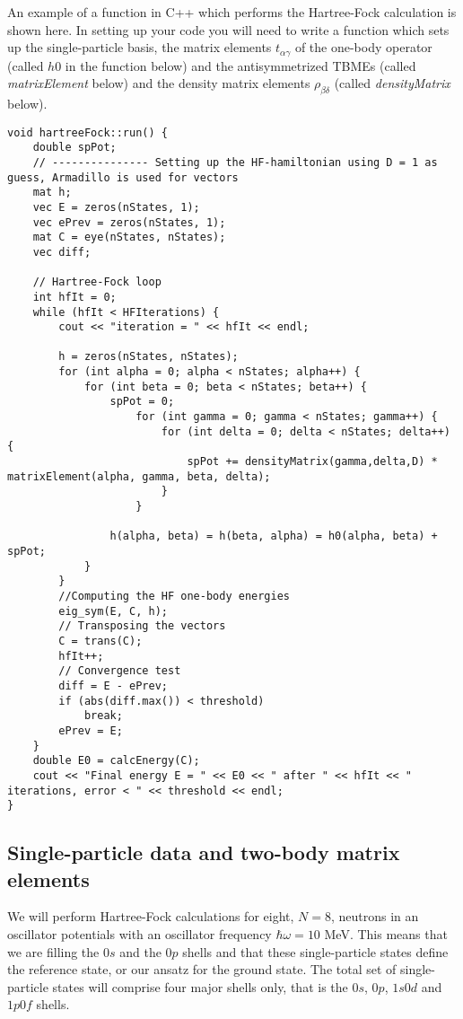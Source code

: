 \documentclass[11pt,a4wide]{article}
\begin{document}
An example of a function in C++ which performs the Hartree-Fock calculation is shown here. In setting up your code you will need to write a function which sets up the single-particle basis, the matrix elements $t_{\alpha\gamma}$ of the one-body operator (called $h0$ in the function below) and the antisymmetrized TBMEs (called {\em matrixElement} below) and the density matrix elements $\rho_{\beta\delta}$ (called {\em densityMatrix} below). 

\begin{lstlisting}
void hartreeFock::run() {
    double spPot;
    // --------------- Setting up the HF-hamiltonian using D = 1 as guess, Armadillo is used for vectors
    mat h;
    vec E = zeros(nStates, 1);
    vec ePrev = zeros(nStates, 1);
    mat C = eye(nStates, nStates);
    vec diff;

    // Hartree-Fock loop
    int hfIt = 0;
    while (hfIt < HFIterations) {
        cout << "iteration = " << hfIt << endl;

        h = zeros(nStates, nStates);
        for (int alpha = 0; alpha < nStates; alpha++) {
            for (int beta = 0; beta < nStates; beta++) {
                spPot = 0;
                    for (int gamma = 0; gamma < nStates; gamma++) {
                        for (int delta = 0; delta < nStates; delta++) {
                            spPot += densityMatrix(gamma,delta,D) * matrixElement(alpha, gamma, beta, delta);
                        }
                    }
                
                h(alpha, beta) = h(beta, alpha) = h0(alpha, beta) + spPot;
            }
        }
        //Computing the HF one-body energies
        eig_sym(E, C, h);
        // Transposing the vectors
        C = trans(C);
        hfIt++;
        // Convergence test
        diff = E - ePrev;
        if (abs(diff.max()) < threshold)
            break;
        ePrev = E;
    }
    double E0 = calcEnergy(C);
    cout << "Final energy E = " << E0 << " after " << hfIt << " iterations, error < " << threshold << endl;
}
\end{lstlisting}

\subsection*{Single-particle data and two-body matrix elements}
We will perform Hartree-Fock calculations for eight, $N=8$, neutrons in an oscillator potentials with an oscillator frequency $\hbar\omega =10$ MeV. This means that we are filling the $0s$ and the $0p$ shells and that these single-particle states define the reference state, or our ansatz for the ground state.
The total set of single-particle states will comprise four major shells only, that is the $0s$, $0p$, $1s0d$ and $1p0f$ shells. 
\end{document}
